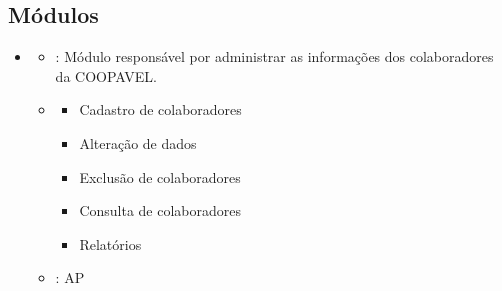 \documentclass[letterpaper,10pt,brazil]{sphinxmanual}
\begin{document}
\subsection{Módulos}
\label{\detokenize{info:modulos}}\begin{itemize}
\item {} \begin{description}
\begin{itemize}
\item {} 
\sphinxAtStartPar
{}: Módulo responsável por administrar as informações dos colaboradores da COOPAVEL.

\item {} \begin{description}
\begin{itemize}
\item {} 
\sphinxAtStartPar
Cadastro de colaboradores

\item {} 
\sphinxAtStartPar
Alteração de dados

\item {} 
\sphinxAtStartPar
Exclusão de colaboradores

\item {} 
\sphinxAtStartPar
Consulta de colaboradores

\item {} 
\sphinxAtStartPar
Relatórios

\end{itemize}

\end{description}

\item {} 
\sphinxAtStartPar
{}: AP

\end{itemize}

\end{description}

\end{itemize}
\end{document}
